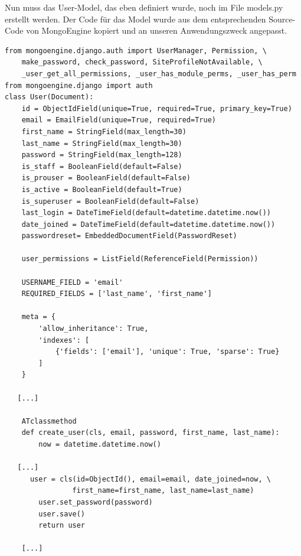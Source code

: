Nun muss das User-Model, das eben definiert wurde, noch im File models.py erstellt werden. Der Code für das Model wurde aus dem entsprechenden Source-Code von MongoEngine \cite{MONGOENGINE} kopiert und an unseren Anwendungszweck angepasst.
\begin{lstlisting}
from mongoengine.django.auth import UserManager, Permission, \
 	make_password, check_password, SiteProfileNotAvailable, \
 	_user_get_all_permissions, _user_has_module_perms, _user_has_perm
from mongoengine.django import auth
class User(Document):
    id = ObjectIdField(unique=True, required=True, primary_key=True)
    email = EmailField(unique=True, required=True)
    first_name = StringField(max_length=30)
    last_name = StringField(max_length=30)
    password = StringField(max_length=128)
    is_staff = BooleanField(default=False)
    is_prouser = BooleanField(default=False)
    is_active = BooleanField(default=True)
    is_superuser = BooleanField(default=False)
    last_login = DateTimeField(default=datetime.datetime.now())
    date_joined = DateTimeField(default=datetime.datetime.now())
    passwordreset= EmbeddedDocumentField(PasswordReset)

    user_permissions = ListField(ReferenceField(Permission))

    USERNAME_FIELD = 'email'
    REQUIRED_FIELDS = ['last_name', 'first_name']

    meta = {
        'allow_inheritance': True,
        'indexes': [
            {'fields': ['email'], 'unique': True, 'sparse': True}
        ]
    }

   [...]

    ATclassmethod
    def create_user(cls, email, password, first_name, last_name):
        now = datetime.datetime.now()

   [...]
 	  user = cls(id=ObjectId(), email=email, date_joined=now, \
 				first_name=first_name, last_name=last_name)
        user.set_password(password)
        user.save()
        return user

    [...]
\end{lstlisting}

